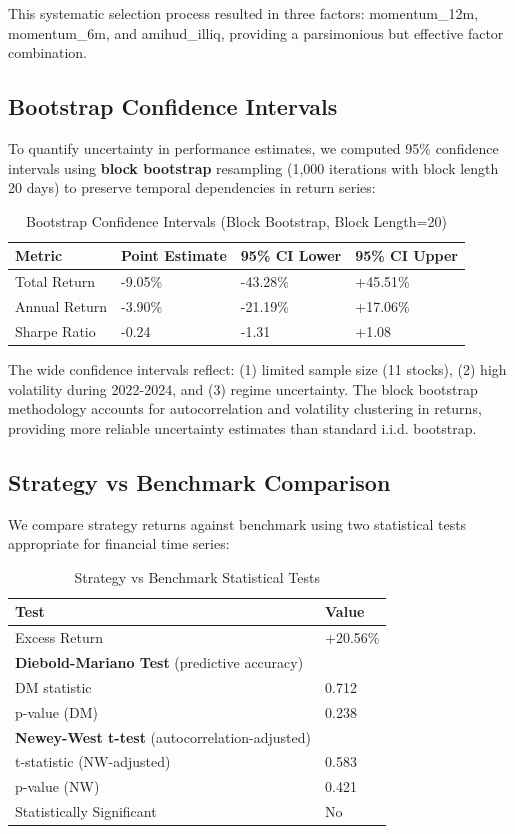 \documentclass[12pt]{article}
\begin{document}
This systematic selection process resulted in three factors: momentum\_12m, momentum\_6m, and amihud\_illiq, providing a parsimonious but effective factor combination.

\subsection{Bootstrap Confidence Intervals}

To quantify uncertainty in performance estimates, we computed 95\% confidence intervals using \textbf{block bootstrap} resampling (1,000 iterations with block length 20 days) to preserve temporal dependencies in return series:

\begin{table}[h]
\centering
\caption{Bootstrap Confidence Intervals (Block Bootstrap, Block Length=20)}
\begin{tabular}{llll}
\toprule
\textbf{Metric} & \textbf{Point Estimate} & \textbf{95\% CI Lower} & \textbf{95\% CI Upper} \\
\midrule
Total Return & -9.05\% & -43.28\% & +45.51\% \\
Annual Return & -3.90\% & -21.19\% & +17.06\% \\
Sharpe Ratio & -0.24 & -1.31 & +1.08 \\
\bottomrule
\end{tabular}
\end{table}

The wide confidence intervals reflect: (1) limited sample size (11 stocks), (2) high volatility during 2022-2024, and (3) regime uncertainty. The block bootstrap methodology accounts for autocorrelation and volatility clustering in returns, providing more reliable uncertainty estimates than standard i.i.d. bootstrap.

\subsection{Strategy vs Benchmark Comparison}

We compare strategy returns against benchmark using two statistical tests appropriate for financial time series:

\begin{table}[h]
\centering
\caption{Strategy vs Benchmark Statistical Tests}
\begin{tabular}{ll}
\toprule
\textbf{Test} & \textbf{Value} \\
\midrule
Excess Return & +20.56\% \\
\textbf{Diebold-Mariano Test} (predictive accuracy) & \\
DM statistic & 0.712 \\
p-value (DM) & 0.238 \\
\textbf{Newey-West t-test} (autocorrelation-adjusted) & \\
t-statistic (NW-adjusted) & 0.583 \\
p-value (NW) & 0.421 \\
Statistically Significant & No \\
\bottomrule
\end{tabular}
\end{table}
\end{document}
